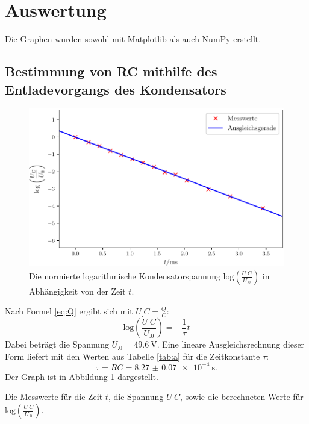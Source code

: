 \section{Auswertung}
\label{sec:Auswertung}

Die Graphen wurden sowohl mit Matplotlib \cite{matplotlib} als auch NumPy \cite{numpy} erstellt.

\subsection{Bestimmung von RC mithilfe des Entladevorgangs des Kondensators}
\begin{figure}
	\centering
	\includegraphics[width=\linewidth-70pt,height=\textheight-70pt,keepaspectratio]{content/images/Graph1.pdf}
	\caption{Die normierte logarithmische Kondensatorspannung $\mathrm{log}\left(\frac{U_.C}{U_.0}\right)$ in Abhängigkeit von der Zeit $t$.}
	\label{fig:Graph1}
\end{figure}

\noindent Nach Formel \eqref{eq:Q} ergibt sich mit $U_.C=\frac{Q}{C}$:
\[
\mathrm{log}\left(\frac{U_.C}{U_.0}\right) = -\frac{1}{\tau}t 
\]
Dabei beträgt die Spannung $U_.0 = \SI{49.6}{\volt}$.
Eine lineare Ausgleichsrechnung dieser Form liefert mit den Werten aus Tabelle \ref{tab:a} für die Zeitkonstante $\tau$:
\[
\tau = RC = \SI{8.27(7)e-4}{\second}\text{.}
\]
Der Graph ist in Abbildung \ref{fig:Graph1} dargestellt.

\begin{table}
	\centering
	\caption{Die Messwerte für die Zeit $t$, die Spannung $U_.C$, sowie die berechneten Werte für $\mathrm{log}\left(\frac{U_.C}{U_.0}\right)$.}
	
	\label{tab:a}
\end{table}

